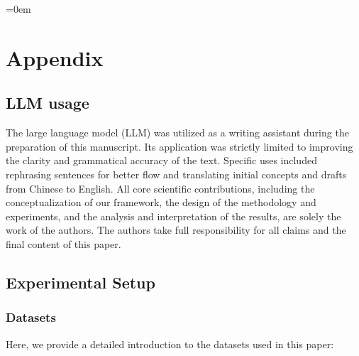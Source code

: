 \onecolumn
{
    \hypersetup{linkcolor=black}
    \parskip=0em
    \renewcommand{\contentsname}{Contents}
    \tableofcontents
}

\newpage

\section{Appendix}
\subsection{LLM usage}
The large language model (LLM) was utilized as a writing assistant during the preparation of this manuscript. Its application was strictly limited to improving the clarity and grammatical accuracy of the text. Specific uses included rephrasing sentences for better flow and translating initial concepts and drafts from Chinese to English. All core scientific contributions, including the conceptualization of our \method framework, the design of the methodology and experiments, and the analysis and interpretation of the results, are solely the work of the authors. The authors take full responsibility for all claims and the final content of this paper.

\subsection{Experimental Setup}
\label{experiment_details}
\subsubsection{Datasets}

Here, we provide a detailed introduction to the datasets used in this paper:


